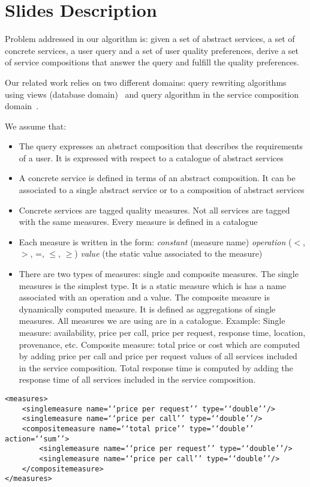 \documentclass[12pt,a4paper,oneside]{article}
\begin{document}
\section{Slides Description}
Problem addressed in our algorithm is: given a set of abstract services, a set of concrete services, a user query and a set of user quality preferences, derive a set of service compositions that answer the query and fulfill the quality preferences.

Our related work relies on two different domains: query rewriting algorithms using views (database domain)~\cite{ref} and query algorithm in the service composition domain~\cite{ref}.

We assume that: 
\begin{itemize}
\item The query expresses an abstract composition that describes the requirements of a user. It is expressed with respect to a catalogue of abstract services
\item A concrete service is defined in terms of an abstract composition. It can be associated to a single abstract service or to a composition of abstract services
\item Concrete services are tagged quality measures. Not all services are tagged with the same measures. Every measure is defined in a catalogue
\item Each measure is written in the form: \textit{constant} (measure name) \textit{operation} ($<$, $>$, =, $\leq$, $\geq$) \textit{value} (the static value associated to the measure)
\item There are two types of measures: single and composite measures. The single measures is the simplest type. It is a static measure which is has a name associated with an operation and a value. The composite measure is dynamically computed measure. It is defined as aggregations of single measures. All measures we are using are in a catalogue. Example:
Single measure: availability, price per call, price per request, response time, location, provenance, etc.
Composite measure: total price or cost which are computed by adding price per call and price per request values of all services included in the service composition. Total response time is computed by adding the response time of all services included in the service composition.
\end{itemize}

\begin{verbatim}
<measures>
	<singlemeasure name=‘‘price per request’’ type=‘‘double’’/>
	<singlemeasure name=‘‘price per call’’ type=‘‘double’’/>
	<compositemeasure name=‘‘total price’’ type=‘‘double’’ action=‘‘sum’’>
		<singlemeasure name=‘‘price per request’’ type=‘‘double’’/>
		<singlemeasure name=‘‘price per call’’ type=‘‘double’’/>
	</compositemeasure>
</measures>
\end{verbatim}
\end{document}
